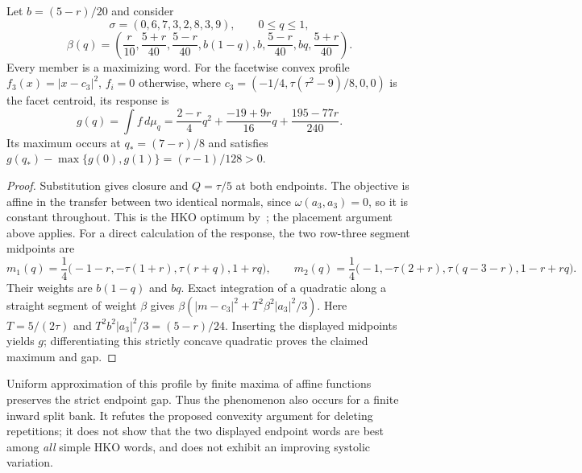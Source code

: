 \begin{proposition}\label{prop:mc-interior}
Let $b=(5-r)/20$ and consider
\[
 \sigma=(0,6,7,3,2,8,3,9),\qquad 0\leq q\leq1,
\]\[
 \beta(q)=\left(\frac r{10},\frac{5+r}{40},\frac{5-r}{40},
 b(1-q),b,\frac{5-r}{40},bq,\frac{5+r}{40}\right).
\]
Every member is a maximizing word. For the facetwise convex profile
$f_3(x)=|x-c_3|^2$, $f_i=0$ otherwise, where
$c_3=(-1/4,\tau(\tau^2-9)/8,0,0)$ is the facet centroid, its response is
\[
 g(q)=\int f\,d\mu_q
 =\frac{2-r}{4}q^2+\frac{-19+9r}{16}q+\frac{195-77r}{240}.
\]
Its maximum occurs at $q_*=(7-r)/8$ and satisfies
$g(q_*)-\max\{g(0),g(1)\}=(r-1)/128>0$.
\end{proposition}
\begin{proof}
Substitution gives closure and $Q=\tau/5$ at both endpoints. The objective
is affine in the transfer between two identical normals, since
$\omega(a_3,a_3)=0$, so it is constant throughout. This is the HKO optimum
by~\cite{HKO2026}; the placement argument above applies.
For a direct calculation of the response, the two row-three segment
midpoints are
\[
 m_1(q)=\frac14\bigl(-1-r,-\tau(1+r),\tau(r+q),1+rq\bigr),\qquad
 m_2(q)=\frac14\bigl(-1,-\tau(2+r),\tau(q-3-r),1-r+rq\bigr).
\]
Their weights are $b(1-q)$ and $bq$. Exact integration of a quadratic along
a straight segment of weight $\beta$ gives
$\beta(|m-c_3|^2+T^2\beta^2|a_3|^2/3)$.
Here $T=5/(2\tau)$ and $T^2b^2|a_3|^2/3=(5-r)/24$.
Inserting the displayed midpoints yields $g$; differentiating this
strictly concave quadratic proves the claimed maximum and gap.
\end{proof}

Uniform approximation of this profile by finite maxima of affine functions
preserves the strict endpoint gap. Thus the phenomenon also occurs for a
finite inward split bank. It refutes the proposed convexity argument for
deleting repetitions; it does not show that the two displayed endpoint words
are best among \emph{all} simple HKO words, and does not exhibit an improving
systolic variation.
